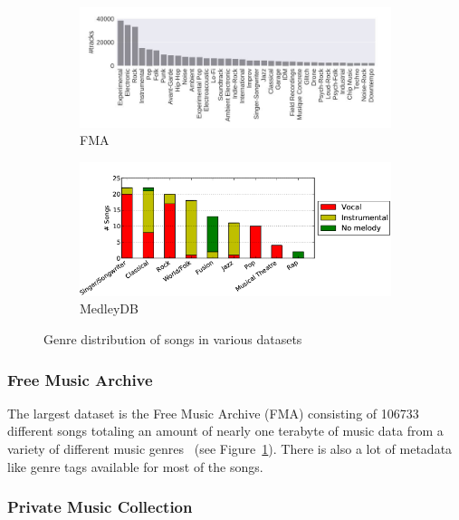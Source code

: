 \begin{figure}[htbp]
{{	\begin{subfigure}{0.5\textwidth}
		\centering
		\includegraphics[scale=0.35]{Images/fma_genre.JPG}
		\caption{FMA~\cite[p. 4]{fma1}}
		\label{fmadist}
	\end{subfigure}
	\begin{subfigure}{0.5\textwidth}
		\centering
		\includegraphics[scale=0.35]{Images/MedleyDB1.png}
		\caption{MedleyDB~\cite[p. 2]{medleydb1}}
		\label{medleydbdist}
	\end{subfigure}
	}}
	\caption{Genre distribution of songs in various datasets}
	\label{fig:datasetdist}
\end{figure}
\FloatBarrier

\subsubsection{Free Music Archive}

The largest dataset is the Free Music Archive (FMA) consisting of 106733 different songs totaling an amount of nearly one terabyte of music data from a variety of different music genres~\cite{fma1} (see Figure~\ref{fmadist}). There is also a lot of metadata like genre tags available for most of the songs.

\subsubsection{Private Music Collection}

